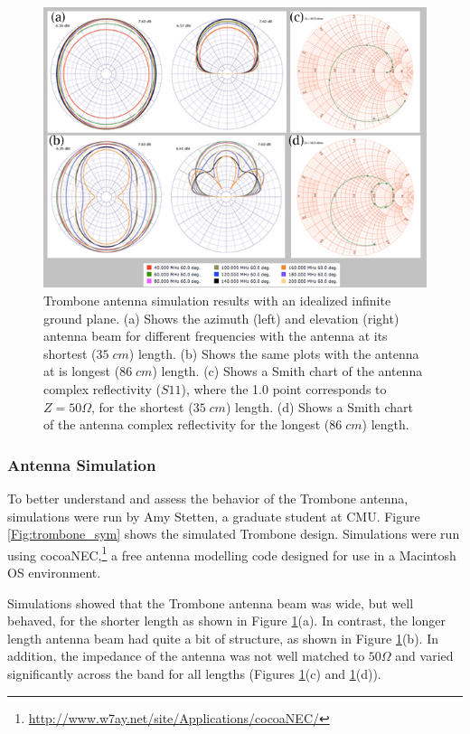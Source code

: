 \begin{figure}[htb]
\begin{center}
\includegraphics[width=0.95\linewidth]{SCIHI_system/figures/trombone_no_gp.jpg}
\caption{Trombone antenna simulation results with an idealized infinite ground plane. (a) Shows the azimuth (left) and elevation (right) antenna beam for different frequencies with the antenna at its shortest ($35 \; cm$) length. (b) Shows the same plots with the antenna at is longest ($86 \; cm$) length. (c) Shows a Smith chart of the antenna complex reflectivity ($S11$), where the 1.0 point corresponds to $Z = 50 \Omega$, for the shortest ($35 \; cm$) length. (d) Shows a Smith chart of the antenna complex reflectivity for the longest ($86 \; cm$) length. }
\label{Fig:trsym_nogp}
\end{center}
\end{figure}

\subsubsection{Antenna Simulation}

To better understand and assess the behavior of the Trombone antenna, simulations were run by Amy Stetten, a graduate student at CMU. Figure \ref{Fig:trombone_sym} shows the simulated Trombone design. Simulations were run using cocoaNEC,\footnote{\url{http://www.w7ay.net/site/Applications/cocoaNEC/}} a free antenna modelling code designed for use in a Macintosh OS environment. 

Simulations showed that the Trombone antenna beam was wide, but well behaved, for the shorter length as shown in Figure \ref{Fig:trsym_nogp}(a). In contrast, the longer length antenna beam had quite a bit of structure, as shown in Figure \ref{Fig:trsym_nogp}(b). In addition, the impedance of the antenna was not well matched to $50 \Omega$ and varied significantly across the band for all lengths (Figures \ref{Fig:trsym_nogp}(c) and \ref{Fig:trsym_nogp}(d)). 

